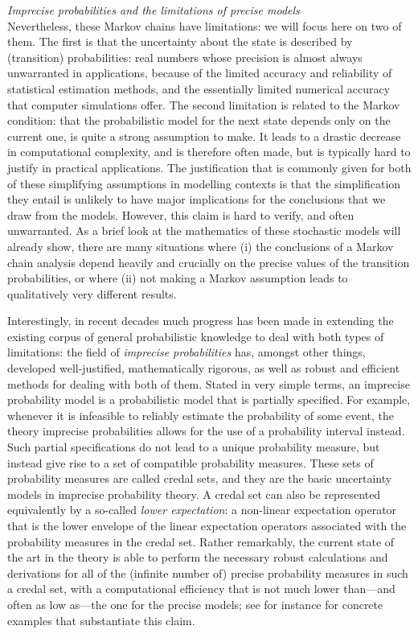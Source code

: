 \documentclass[11pt,dvipsnames,usenames,a4paper]{article}
\begin{document}
\emph{Imprecise probabilities and the limitations of precise models}\\[5pt]
Nevertheless, these Markov chains have limitations: we will focus here on two of them.
The first is that the uncertainty about the state is described by (transition) probabilities: real numbers whose precision is almost always unwarranted in applications, because of the limited accuracy and reliability of statistical estimation methods, and the essentially limited numerical accuracy that computer simulations offer.
The second limitation is related to the Markov condition: that the probabilistic model for the next state depends only on the current one, is quite a strong assumption to make. 
It leads to a drastic decrease in computational complexity, and is therefore often made, but is typically hard to justify in practical applications.
The justification that is commonly given for both of these simplifying assumptions in modelling contexts is that the simplification they entail is unlikely to have major implications for the conclusions that we draw from the models.
However, this claim is hard to verify, and often unwarranted.
As a brief look at the mathematics of these stochastic models will already show, there are many situations where (i) the conclusions of a Markov chain analysis depend heavily and crucially on the precise values of the transition probabilities, or where (ii) not making a Markov assumption leads to qualitatively very different results.

Interestingly, in recent decades much progress has been made in extending the existing corpus of general probabilistic knowledge to deal with both types of limitations: the field of \emph{imprecise probabilities} \cite{walley1991,augustin2013:itip,troffaes2013:lp} has, amongst other things, developed well-justified, mathematically rigorous, as well as robust and efficient methods for dealing with both of them.
Stated in very simple terms, an imprecise probability model is a probabilistic model that is partially specified.
For example, whenever it is infeasible to reliably estimate the probability of some event, the theory imprecise probabilities allows for the use of a probability interval instead.
Such partial specifications do not lead to a unique probability measure, but instead give rise to a set of compatible probability measures.
These sets of probability measures are called credal sets, and they are the basic uncertainty models in imprecise probability theory. 
A credal set can also be represented equivalently by a so-called \emph{lower expectation}: a non-linear expectation operator that is the lower envelope of the linear expectation operators associated with the probability measures in the credal set.
Rather remarkably, the current state of the art in the theory is able to perform the necessary robust calculations and derivations for all of the (infinite number of) precise probability measures in such a credal set, with a computational efficiency that is not much lower than---and often as low as---the one for the precise models; see for instance \cite{cooman2009,debock2014:estihmm,debock2015:thesis,cooman2008} for concrete examples that substantiate this claim.
\end{document}
